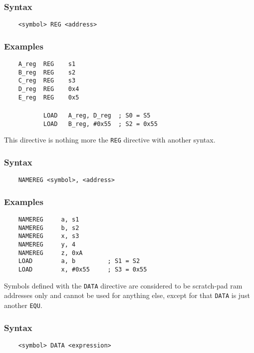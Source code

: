     \subsubsection{Syntax}
        \verb'    <symbol> REG <address>'

    \subsubsection{Examples}
        \verb'    A_reg  REG    s1'\\
        \verb'    B_reg  REG    s2'\\
        \verb'    C_reg  REG    s3'\\
        \verb'    D_reg  REG    0x4'\\
        \verb'    E_reg  REG    0x5'\\
        \verb''\\
        \verb'           LOAD   A_reg, D_reg  ; S0 = S5'\\
        \verb'           LOAD   B_reg, #0x55  ; S2 = 0x55'

    This directive is nothing more the \texttt{REG} directive with another syntax.

    \subsubsection{Syntax}
        \verb'    NAMEREG <symbol>, <address> '

    \subsubsection{Examples}
        \verb'    NAMEREG     a, s1'\\
        \verb'    NAMEREG     b, s2'\\
        \verb'    NAMEREG     x, s3'\\
        \verb'    NAMEREG     y, 4'\\
        \verb'    NAMEREG     z, 0xA'
        \verb''\\
        \verb'    LOAD        a, b         ; S1 = S2'\\
        \verb'    LOAD        x, #0x55     ; S3 = 0x55'

\clearpage
{}
    Symbols defined with the \texttt{DATA} directive are considered to be scratch-pad ram addresses only and cannot be used for anything else, except for that \texttt{DATA} is just another \texttt{EQU}.

    \subsubsection{Syntax}
        \verb'    <symbol> DATA <expression>'

